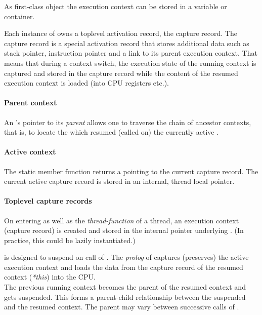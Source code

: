 As first-class object the execution context can be stored in a variable or
container.

Each instance of \ectx owns a toplevel activation record, the capture record.
The capture record is a special activation record that stores additional data
such as stack pointer, instruction pointer and a link to its parent execution
context. That means that during a context switch, the execution state
of the running context is captured and stored in the capture record while the
content of the resumed execution context is loaded (into CPU registers etc.).

\paragraph*{Parent context}
An 's pointer to
its \emph{parent}  allows one to traverse the chain of
ancestor contexts, that is, to locate the  which resumed
(called \ectxop on) the currently active .

\paragraph*{Active context}
The static member function \ectxcurrent returns a \ectx pointing to the
current capture record. The current active capture record is stored in an
internal, thread local pointer.

\paragraph*{Toplevel capture records}
On entering \main as well as the \emph{thread-function} of a thread, an execution
context (capture record) is created and stored in the internal pointer underlying
\ectxcurrent. (In practice, this could be lazily instantiated.)

\ectx is designed to suspend on call of \ectxop. The \emph{prolog} of \ectxop
captures (preserves) the active execution context and loads the data from the
capture record of the resumed context (\emph{*this}) into the CPU.\\
The previous running context becomes the parent of the resumed context and gets
suspended. This forms a parent-child relationship between the suspended and
the resumed context. The parent may vary between successive calls of \ectxop.

